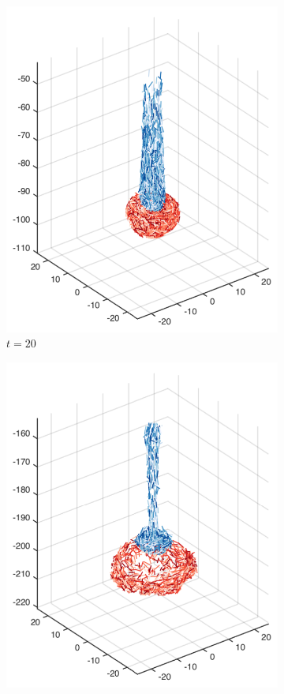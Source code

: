 \begin{figure}[!htbp]
\begin{subfigure}[h]{0.24\textwidth}
    \includegraphics[width=\textwidth]{img/mixing/top_00020.pdf}
    \caption{$t=20$}\label{fig:mixing_top_b}
  \end{subfigure}
  \begin{subfigure}[h]{0.24\textwidth}
    \centering
    \includegraphics[width=\textwidth]{img/mixing/top_00060.pdf}

\end{subfigure}
\end{figure}
